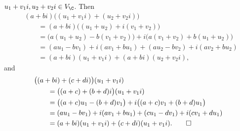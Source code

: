 \begin{solution}
\begin{enumerate}[label=\arabic*)]
  $u_1+v_1i,u_2+v_2i\in V_{\C}$. Then
  \begin{align*}
  &(a+bi)\bigl((u_1+v_1i)+(u_2+v_2i)\bigr)\\
    &\qquad= (a+bi)\bigl((u_1+u_2)+i(v_1+v_2)\bigr)\\
    &\qquad= \bigl(a(u_1+u_2)-b(v_1+v_2)\bigr)+i\bigl(a(v_1+v_2)+b(u_1+u_2)\bigr)\\
    &\qquad= (au_1-bv_1)+i(av_1+bu_1)+(au_2-bv_2)+i(av_2+bu_2)\\
    &\qquad= (a+bi)(u_1+v_1i)+(a+bi)(u_2+v_2i),
  \end{align*}
  and
  \begin{align*}
  &\bigl((a+bi)+(c+di)\bigr)(u_1+v_1i)\\
    &\qquad= \bigl((a+c)+(b+d)i\bigr)(u_1+v_1i)\\
    &\qquad= \bigl((a+c)u_1-(b+d)v_1\bigr)+i\bigl((a+c)v_1+(b+d)u_1\bigr)\\
    &\qquad= (au_1-bv_1)+i(av_1+bu_1)+(cu_1-dv_1)+i(cv_1+du_1)\\
    &\qquad= (a+bi)(u_1+v_1i)+(c+di)(u_1+v_1i). \qedhere
  \end{align*}
\end{enumerate}
\end{solution}

